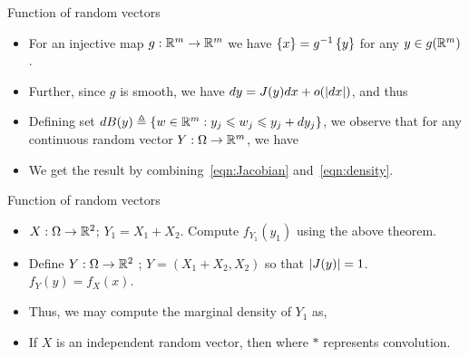 \documentclass[12pt,aspectratio=169]{beamer}
\begin{document}
\begin{frame}{Function of random vectors}
\begin{Proof}
\begin{itemize}
\item <1-> For an injective map $g: \mathbb{R}^m \to \mathbb{R}^m$ we have $\left\{x\right\} = g^{-1}\left\{y\right\}$ for any $y \in g(\mathbb{R}^m)$. 
\item <2-> Further, since $g$ is smooth, we have $dy = J(y)dx + o(\left\lvert dx\right\rvert)$, 
and thus
\item <3-> Defining set $dB(y) \triangleq \left\{w \in \mathbb{R}^m: y_j \leqslant w_j \leqslant y_j+dy_j\right\}$, 
we observe that for any continuous random vector $Y: \Omega \to \mathbb{R}^m$, we have 
\item <3-> We get the result by combining~\eqref{eqn:Jacobian} and~\eqref{eqn:density}.
\end{itemize}
\end{Proof}
\end{frame}


\begin{frame}{Function of random vectors}
\begin{Example}
\begin{itemize}
\item <1-> $X: \Omega \to \mathbb{R}^2$; $Y_1 = X_1 + X_2$. Compute $f_{Y_1}(y_1)$ using the above theorem. 
\item <2-> Define $Y: \Omega \to \mathbb{R}^2$ ; $Y = (X_1+X_2, X_2)$ so that $\left\lvert J(y)\right\rvert = 1$. \implies $f_{Y}(y) = f_{X}(x)$.
\item <3-> Thus, we may compute the marginal density of $Y_1$ as,
\item <4-> If $X$ is an independent random vector, then 
where $*$ represents convolution.
\end{itemize}
\end{Example}
\end{frame}
\end{document}
